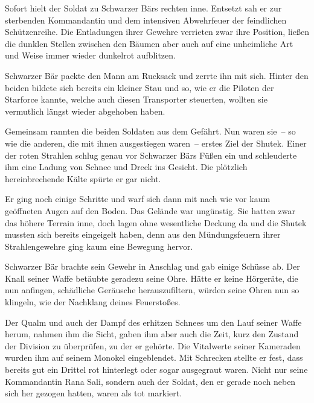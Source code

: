 Sofort hielt der Soldat zu Schwarzer Bärs rechten inne. Entsetzt sah er zur sterbenden Kommandantin und dem intensiven Abwehrfeuer der feindlichen Schützenreihe. Die Entladungen ihrer Gewehre verrieten zwar ihre Position, ließen die dunklen Stellen zwischen den Bäumen aber auch auf eine unheimliche Art und Weise immer wieder dunkelrot aufblitzen.

\par

Schwarzer Bär packte den Mann am Rucksack und zerrte ihn mit sich. Hinter den beiden bildete sich bereits ein kleiner Stau und so, wie er die Piloten der Starforce kannte, welche auch diesen Transporter steuerten, wollten sie vermutlich längst wieder abgehoben haben.

\par

Gemeinsam rannten die beiden Soldaten aus dem Gefährt. Nun waren sie~-- so wie die anderen, die mit ihnen ausgestiegen waren~-- erstes Ziel der Shutek. Einer der roten Strahlen schlug genau vor Schwarzer Bärs Füßen ein und schleuderte ihm eine Ladung von Schnee und Dreck ins Gesicht. Die plötzlich hereinbrechende Kälte spürte er gar nicht.

\par

Er ging noch einige Schritte und warf sich dann mit nach wie vor kaum geöffneten Augen auf den Boden. Das Gelände war ungünstig. Sie hatten zwar das höhere Terrain inne, doch lagen ohne wesentliche Deckung da und die Shutek mussten sich bereits eingeigelt haben, denn aus den Mündungsfeuern ihrer Strahlengewehre ging kaum eine Bewegung hervor.

\par

Schwarzer Bär brachte sein Gewehr in Anschlag und gab einige Schüsse ab. Der Knall seiner Waffe betäubte geradezu seine Ohre. Hätte er keine Hörgeräte, die nun anfingen, schädliche Geräusche herauszufiltern, würden seine Ohren nun so klingeln, wie der Nachklang deines Feuerstoßes.

\par

Der Qualm und auch der Dampf des erhitzen Schnees um den Lauf seiner Waffe herum, nahmen ihm die Sicht, gaben ihm aber auch die Zeit, kurz den Zustand der Division zu überprüfen, zu der er gehörte. Die Vitalwerte seiner Kameraden wurden ihm auf seinem Monokel eingeblendet. Mit Schrecken stellte er fest, dass bereits gut ein Drittel rot hinterlegt oder sogar ausgegraut waren. Nicht nur seine Kommandantin Rana Sali, sondern auch der Soldat, den er gerade noch neben sich her gezogen hatten, waren als tot markiert.

